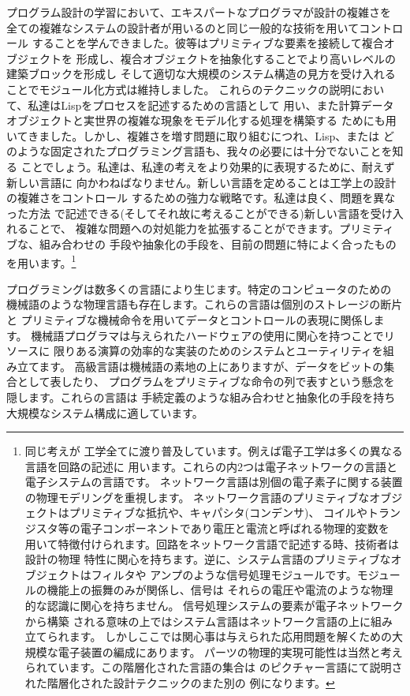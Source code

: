 \noindent
プログラム設計の学習において、エキスパートなプログラマが設計の複雑さを
全ての複雑なシステムの設計者が用いるのと同じ一般的な技術を用いてコントロール
することを学んできました。彼等はプリミティブな要素を接続して複合オブジェクトを
形成し、複合オブジェクトを抽象化することでより高いレベルの建築ブロックを形成し
そして適切な大規模のシステム構造の見方を受け入れることでモジュール化方式は維持しました。
これらのテクニックの説明において、私達はLispをプロセスを記述するための言語として
用い、また計算データオブジェクトと実世界の複雑な現象をモデル化する処理を構築する
ためにも用いてきました。しかし、複雑さを増す問題に取り組むにつれ、Lisp、または
どのような固定されたプログラミング言語も、我々の必要には十分でないことを知る
ことでしょう。私達は、私達の考えをより効果的に表現するために、耐えず新しい言語に
向かわねばなりません。新しい言語を定めることは工学上の設計の複雑さをコントロール
するための強力な戦略です。私達は良く、問題を異なった方法
で記述できる(そしてそれ故に考えることができる)新しい言語を受け入れることで、
複雑な問題への対処能力を拡張することができます。プリミティブな、組み合わせの
手段や抽象化の手段を、目前の問題に特によく合ったものを用います。\footnote{同じ考えが
工学全てに渡り普及しています。例えば電子工学は多くの異なる言語を回路の記述に
用います。これらの内2つは電子ネットワークの言語と電子システムの言語です。
ネットワーク言語は別個の電子素子に関する装置の物理モデリングを重視します。
ネットワーク言語のプリミティブなオブジェクトはプリミティブな抵抗や、キャパシタ(コンデンサ)、
コイルやトランジスタ等の電子コンポーネントであり電圧と電流と呼ばれる物理的変数を
用いて特徴付けられます。回路をネットワーク言語で記述する時、技術者は設計の物理
特性に関心を持ちます。逆に、システム言語のプリミティブなオブジェクトはフィルタや
アンプのような信号処理モジュールです。モジュールの機能上の振舞のみが関係し、信号は
それらの電圧や電流のような物理的な認識に関心を持ちません。
信号処理システムの要素が電子ネットワークから構築
される意味の上ではシステム言語はネットワーク言語の上に組み立てられます。
しかしここでは関心事は与えられた応用問題を解くための大規模な電子装置の編成にあります。
パーツの物理的実現可能性は当然と考えられています。この階層化された言語の集合は
のピクチャー言語にて説明された階層化された設計テクニックのまた別の
例になります。}



プログラミングは数多くの言語により生じます。特定のコンピュータのための
機械語のような物理言語も存在します。これらの言語は個別のストレージの断片と
プリミティブな機械命令を用いてデータとコントロールの表現に関係します。
機械語プログラマは与えられたハードウェアの使用に関心を持つことでリソースに
限りある演算の効率的な実装のためのシステムとユーティリティを組み立てます。
高級言語は機械語の素地の上にありますが、データをビットの集合として表したり、
プログラムをプリミティブな命令の列で表すという懸念を隠します。これらの言語は
手続定義のような組み合わせと抽象化の手段を持ち大規模なシステム構成に適しています。



